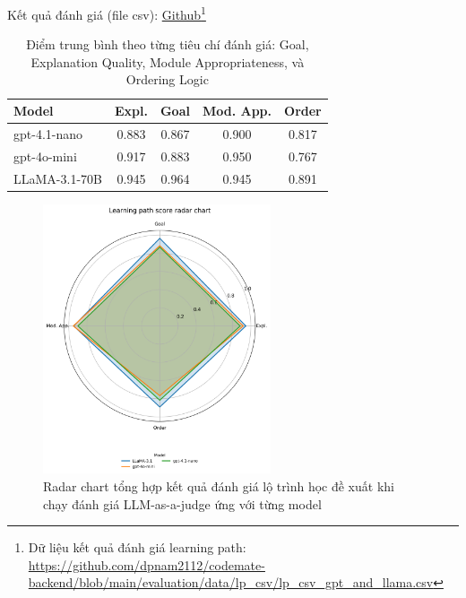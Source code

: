 Kết quả đánh giá (file csv): \href{https://github.com/dpnam2112/codemate-backend/blob/main/evaluation/data/lp_csv/lp_csv_gpt_and_llama.csv}{Github}\footnote{Dữ liệu kết quả đánh giá learning path: \url{https://github.com/dpnam2112/codemate-backend/blob/main/evaluation/data/lp_csv/lp_csv_gpt_and_llama.csv}}

\begin{table}[h!]
\centering
\caption{Điểm trung bình theo từng tiêu chí đánh giá: Goal, Explanation Quality, Module Appropriateness, và Ordering Logic}
\begin{tabular}{lcccc}
\toprule
\textbf{Model} & \textbf{Expl.} & \textbf{Goal} & \textbf{Mod. App.} & \textbf{Order} \\
\midrule
gpt-4.1-nano & 0.883 & 0.867 & 0.900 & 0.817 \\
gpt-4o-mini  & 0.917 & 0.883 & 0.950 & 0.767 \\
LLaMA-3.1-70B & 0.945 & 0.964 & 0.945 & 0.891 \\
\bottomrule
\end{tabular}

\label{tab:avg_scores_abbr}
\end{table}

\begin{figure}[H]
\centering
    \includegraphics[width=0.6\textwidth]{images/lp_eval_radar_chart.png}
    \caption{Radar chart tổng hợp kết quả đánh giá lộ trình học đề xuất khi chạy đánh giá LLM-as-a-judge ứng với từng model}
\end{figure}

